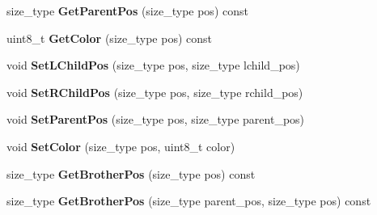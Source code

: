 \begin{DoxyCompactItemize}
\item 
\hypertarget{classlsf_1_1container_1_1detail_1_1RBTreeState_afadd26b45d6b8b463f5e952e81693c70}{
size\_\-type {\bfseries GetParentPos} (size\_\-type pos) const }
\label{classlsf_1_1container_1_1detail_1_1RBTreeState_afadd26b45d6b8b463f5e952e81693c70}

\item 
\hypertarget{classlsf_1_1container_1_1detail_1_1RBTreeState_a1b4d4966a5d945dee0693ee4fc0ead9f}{
uint8\_\-t {\bfseries GetColor} (size\_\-type pos) const }
\label{classlsf_1_1container_1_1detail_1_1RBTreeState_a1b4d4966a5d945dee0693ee4fc0ead9f}

\item 
\hypertarget{classlsf_1_1container_1_1detail_1_1RBTreeState_a3254b17590a9090a42b8e87169247cae}{
void {\bfseries SetLChildPos} (size\_\-type pos, size\_\-type lchild\_\-pos)}
\label{classlsf_1_1container_1_1detail_1_1RBTreeState_a3254b17590a9090a42b8e87169247cae}

\item 
\hypertarget{classlsf_1_1container_1_1detail_1_1RBTreeState_ab01c4db737db0f0df682e23e1e969a91}{
void {\bfseries SetRChildPos} (size\_\-type pos, size\_\-type rchild\_\-pos)}
\label{classlsf_1_1container_1_1detail_1_1RBTreeState_ab01c4db737db0f0df682e23e1e969a91}

\item 
\hypertarget{classlsf_1_1container_1_1detail_1_1RBTreeState_a51a8992824c37f52d873c256bb72bd58}{
void {\bfseries SetParentPos} (size\_\-type pos, size\_\-type parent\_\-pos)}
\label{classlsf_1_1container_1_1detail_1_1RBTreeState_a51a8992824c37f52d873c256bb72bd58}

\item 
\hypertarget{classlsf_1_1container_1_1detail_1_1RBTreeState_a06c65283747e7b69fd3cd4a58adf5084}{
void {\bfseries SetColor} (size\_\-type pos, uint8\_\-t color)}
\label{classlsf_1_1container_1_1detail_1_1RBTreeState_a06c65283747e7b69fd3cd4a58adf5084}

\item 
\hypertarget{classlsf_1_1container_1_1detail_1_1RBTreeState_adb851432deabd89eb484a4bf6531ef58}{
size\_\-type {\bfseries GetBrotherPos} (size\_\-type pos) const }
\label{classlsf_1_1container_1_1detail_1_1RBTreeState_adb851432deabd89eb484a4bf6531ef58}

\item 
\hypertarget{classlsf_1_1container_1_1detail_1_1RBTreeState_aab0261c78ff0e0b81be51aa84dd18e5d}{
size\_\-type {\bfseries GetBrotherPos} (size\_\-type parent\_\-pos, size\_\-type pos) const }
\label{classlsf_1_1container_1_1detail_1_1RBTreeState_aab0261c78ff0e0b81be51aa84dd18e5d}

\end{DoxyCompactItemize}
